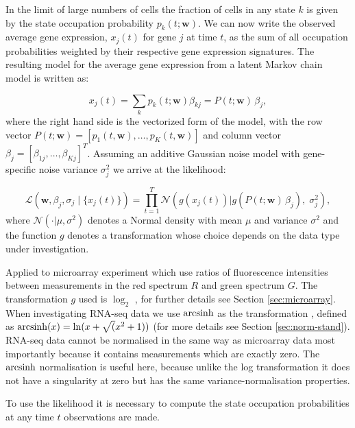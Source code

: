 In the limit of large numbers of cells the fraction of cells in any state $k$ is given by the state occupation probability $p_k(t;\mathbf{w})$. We can now write the observed average gene expression, $x_j(t)$ for gene $j$ at time $t$, as the sum of all occupation probabilities weighted by their respective gene expression signatures. The resulting model for the average gene expression from a latent Markov chain model is written as:

\begin{equation}
  x_j(t) = \sum_k p_k(t;\mathbf{w})\beta_{kj} = P(t;\mathbf{w}) \, \beta_j,
  \label{eq:model}
\end{equation}
where the right hand side is the vectorized form of the model, with the row vector $P(t;\mathbf{w}) = [p_1(t,\mathbf{w}), \ldots , p_K(t,\mathbf{w})]$ and column vector $\beta_j = [\beta_{1j}, \ldots , \beta_{Kj}]^T$. Assuming an additive Gaussian noise model with gene-specific noise variance $\sigma_j^2 $ we arrive at the likelihood:

\begin{equation}
  \label{eq:likelihood}
    \mathcal{L} \left(\mathbf{w}, \beta_j, \sigma_j \;|\; \lbrace x_j(t)\rbrace\right) = 
\prod_{t=1}^T \mathcal{N}\left(g(x_j(t)) | g\left(P(t; \mathbf{w})\,\beta_j\right),\; \sigma_j^2 \right),
\end{equation}
where $\mathcal{N}(\cdot | \mu,\sigma^2)$ denotes a Normal density with mean $\mu$ and variance $\sigma^2$ and the function $g$ denotes a transformation whose choice depends on the data type under investigation.

Applied to microarray experiment which use ratios of fluorescence intensities between measurements in the red spectrum $R$ and green spectrum $G$. The transformation $g$ used is $\log_2$ \cite{Dudoit:2002va}, for further details see Section \ref{sec:microarray}. When investigating RNA-seq data we use $\operatorname{arcsinh}$ as the transformation \citep{Hoffman:2012gn,Johnson:1949uq}, defined as $\operatorname{arcsinh}(x) = \ln(x + \sqrt(x^2 +1))$ (for more details see Section \ref{sec:norm-stand}). RNA-seq data cannot be normalised in the same way as microarray data most importantly because it contains measurements which are exactly zero. The $\operatorname{arcsinh}$ normalisation is useful here, because unlike the log transformation it does not have a singularity at zero but has the same variance-normalisation properties.

To use the likelihood it is necessary to compute the state occupation probabilities at any time $t$ observations are made.


